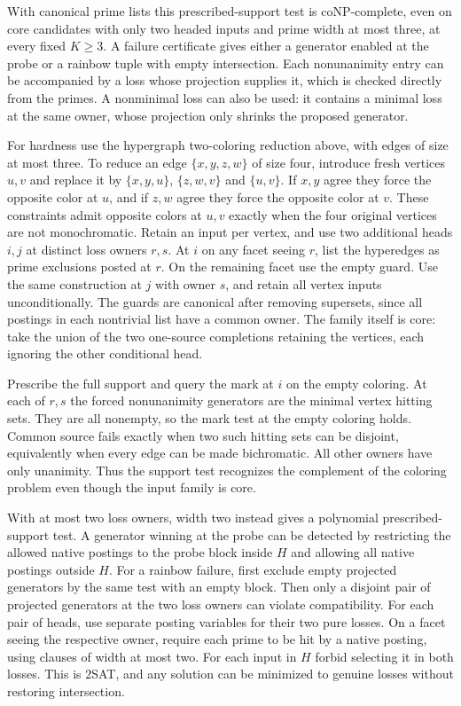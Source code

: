 With canonical prime lists this prescribed-support test is
coNP-complete, even on core candidates with only two headed
inputs and prime width at most three, at every fixed $K\ge3$.
A failure certificate gives either a generator enabled at
the probe or a rainbow tuple with empty intersection.
Each nonunanimity entry can be accompanied by a loss whose
projection supplies it, which is checked directly from the
primes. A nonminimal loss can also be used: it contains
a minimal loss at the same owner, whose projection only
shrinks the proposed generator.

For hardness use the hypergraph two-coloring reduction above,
with edges of size at most three. To reduce an edge
$\{x,y,z,w\}$ of size four, introduce fresh vertices $u,v$
and replace it by $\{x,y,u\}$, $\{z,w,v\}$ and $\{u,v\}$.
If $x,y$ agree they force the opposite color at $u$, and
if $z,w$ agree they force the opposite color at $v$.
These constraints admit opposite colors at $u,v$ exactly
when the four original vertices are not monochromatic.
Retain an input per vertex,
and use two additional heads $i,j$ at distinct loss owners
$r,s$. At $i$ on any facet seeing $r$, list the hyperedges as
prime exclusions posted at $r$. On the remaining facet use
the empty guard. Use the same construction at $j$ with owner
$s$, and retain all vertex inputs unconditionally. The
guards are canonical after removing supersets, since all
postings in each nontrivial list have a common owner.
The family itself is core: take the union of the two
one-source completions retaining the vertices, each ignoring
the other conditional head.

Prescribe the full support and query the mark at $i$ on
the empty coloring. At each of $r,s$ the forced
nonunanimity generators are the minimal vertex hitting sets.
They are all nonempty, so the mark test at the empty
coloring holds. Common source fails exactly when two such
hitting sets can be disjoint, equivalently when every edge
can be made bichromatic. All other owners have only
unanimity. Thus the support test recognizes the complement
of the coloring problem even though the input family is core.

With at most two loss owners, width two instead gives a
polynomial prescribed-support test. A generator winning at
the probe can be detected by restricting the allowed native
postings to the probe block inside $H$ and allowing all native
postings outside $H$. For a rainbow failure, first exclude
empty projected generators by the same test with an empty
block. Then only a disjoint pair of projected generators
at the two loss owners can violate compatibility. For each
pair of heads, use separate posting variables for their two
pure losses. On a facet seeing the respective owner, require
each prime to be hit by a native posting, using clauses of
width at most two. For each input in $H$ forbid selecting it
in both losses. This is $2$SAT, and any solution can be
minimized to genuine losses without restoring intersection.

